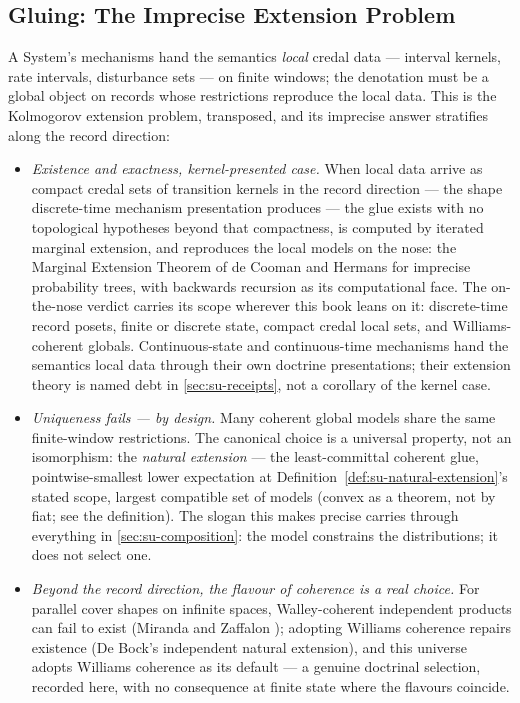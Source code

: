 \subsection{Gluing: The Imprecise Extension Problem}

A System's
mechanisms hand the semantics \emph{local} credal data --- interval
kernels, rate intervals, disturbance sets --- on finite windows; the
denotation must be a global object on records whose restrictions
reproduce the local data. This is the Kolmogorov extension problem,
transposed, and its imprecise answer stratifies along the record direction:

\begin{itemize}
\item \emph{Existence and exactness, kernel-presented case.} When
  local data arrive as compact credal sets of transition kernels in
  the record direction --- the shape discrete-time mechanism
  presentation produces --- the glue exists with no topological
  hypotheses beyond that compactness, is computed by iterated
  marginal extension, and reproduces the local models on the nose:
  the Marginal Extension Theorem of de Cooman and Hermans
  \cite{cooman08} for imprecise probability trees, with backwards
  recursion as its computational face. The on-the-nose verdict
  carries its scope wherever this book leans on it: discrete-time
  record posets, finite or discrete state, compact credal local
  sets, and Williams-coherent globals. Continuous-state and
  continuous-time mechanisms hand the semantics local data through
  their own doctrine presentations; their extension theory is named
  debt in \autoref{sec:su-receipts}, not a corollary of the
  kernel case.
\item \emph{Uniqueness fails --- by design.} Many coherent global
  models share the same finite-window restrictions. The canonical
  choice is a universal property, not an isomorphism: the
  \emph{natural extension} --- the least-committal coherent glue,
  pointwise-smallest lower expectation at
  Definition~\ref{def:su-natural-extension}'s stated scope, largest
  compatible set of models (convex as a theorem, not by fiat; see the
  definition). The slogan this
  makes precise carries through everything in
  \autoref{sec:su-composition}: the model constrains the
  distributions; it does not select one.
\item \emph{Beyond the record direction, the flavour of coherence is
  a real choice.} For parallel cover shapes on infinite spaces,
  Walley-coherent independent products can fail to exist (Miranda
  and Zaffalon \cite{miranda-zaffalon-2015-independent-products});
  adopting Williams coherence repairs existence (De Bock's
  independent natural extension), and this universe adopts Williams
  coherence as its default --- a genuine doctrinal selection,
  recorded here, with no consequence at finite
  state where the flavours coincide.
\end{itemize}

